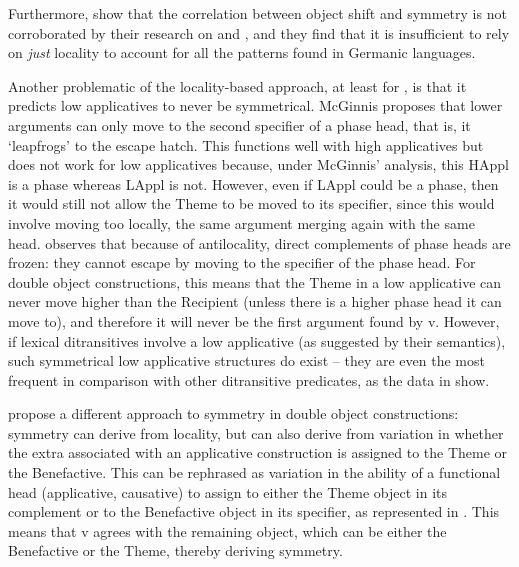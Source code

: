 \documentclass[output=paper]{LSP/langsci}
\begin{document}
Furthermore, \citet{HaddicanHolmberg2012,HaddicanHolmberg2015} show that the correlation between object shift and symmetry is not corroborated by their research on  and , and they find that it is insufficient to rely on \textit{just} locality to account for all the patterns found in Germanic languages.

Another problematic  of the locality-based approach, at least for \citet{McGinnis2001}, is that it predicts low applicatives to never be symmetrical. McGinnis proposes that lower arguments can only move to the second specifier of a phase head, that is, it ‘leapfrogs’ to the escape hatch. This functions well with high applicatives but does not work for low applicatives because, under McGinnis’ analysis, this HAppl is a phase whereas LAppl is not. However, even if LAppl could be a phase, then it would still not allow the Theme to be moved to its specifier, since this would involve moving too locally, the same argument merging again with the same head. \citet{Abels2003} observes that because of antilocality, direct complements of phase heads are frozen: they cannot escape by moving to the specifier of the phase head. For double object constructions, this means that the Theme in a low applicative can never move higher than the Recipient (unless there is a higher phase head it can move to), and therefore it will never be the first argument found by v. However, if lexical ditransitives involve a low applicative (as suggested by their semantics), such symmetrical low applicative structures do exist -- they are even the most frequent in comparison with other ditransitive predicates, as the data in  show.

\citet{HaddicanHolmberg2012,HaddicanHolmberg2015} propose a different approach to symmetry in double object constructions: symmetry can derive from locality, but can also derive from variation in whether the extra  associated with an applicative construction is assigned to the Theme or the Benefactive. This can be rephrased as variation in the ability of a functional head (applicative, causative) to assign  to either the Theme object in its complement or to the Benefactive object in its specifier, as represented in . This means that v agrees with the remaining object, which can be either the Benefactive or the Theme, thereby deriving symmetry.
\end{document}
